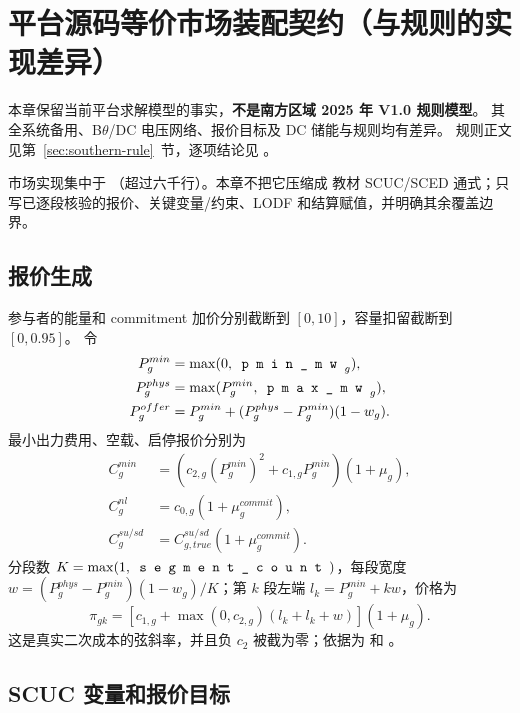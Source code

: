 \section{平台源码等价市场装配契约（与规则的实现差异）}

\begin{gapnote}
本章保留当前平台求解模型的事实，\textbf{不是南方区域 2025 年 V1.0 规则模型}。
其全系统备用、B$\theta$/DC 电压网络、报价目标及 DC 储能与规则均有差异。
规则正文见第~\ref{sec:southern-rule}~节，逐项结论见
。
\end{gapnote}

市场实现集中于 （超过六千行）。本章不把它压缩成
教材 SCUC/SCED 通式；只写已逐段核验的报价、关键变量/约束、LODF 和结算赋值，并明确其余覆盖边界。

\subsection{报价生成}

参与者的能量和 commitment 加价分别截断到 $[0,10]$，容量扣留截断到 $[0,0.95]$。
令
\begin{align}
 P_g^{min}&=\max(0,\fld{pmin\_mw}_g),\\
 P_g^{phys}&=\max(P_g^{min},\fld{pmax\_mw}_g),\\
 P_g^{offer}&=P_g^{min}+(P_g^{phys}-P_g^{min})(1-w_g).
\end{align}
最小出力费用、空载、启停报价分别为
\begin{align}
 C_g^{min}&=(c_{2,g}(P_g^{min})^2+c_{1,g}P_g^{min})(1+\mu_g),\\
 C_g^{nl}&=c_{0,g}(1+\mu_g^{commit}),\\
 C_g^{su/sd}&=C_{g,true}^{su/sd}(1+\mu_g^{commit}).
\end{align}
分段数 $K=\max(1,\fld{segment\_count})$，每段宽度
$w=(P_g^{phys}-P_g^{min})(1-w_g)/K$；第 $k$ 段左端
$l_k=P_g^{min}+kw$，价格为
\begin{equation}
 \pi_{gk}=\left[c_{1,g}+\max(0,c_{2,g})(l_k+l_k+w)\right](1+\mu_g).
\end{equation}
这是真实二次成本的弦斜率，并且负 $c_2$ 被截为零；依据为
 和
。

\subsection{SCUC 变量和报价目标}

